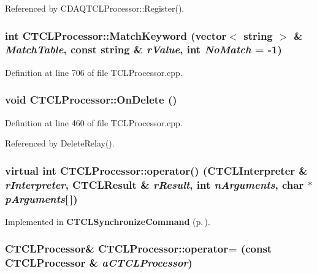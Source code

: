 Referenced by CDAQTCLProcessor::Register().
\subsubsection{\setlength{\rightskip}{0pt plus 5cm}int CTCLProcessor::Match\-Keyword (vector$<$ string $>$ \& {\em Match\-Table}, const string \& {\em r\-Value}, int {\em No\-Match} = -1)\hspace{0.3cm}{\tt  [static]}}\label{classCTCLProcessor_d3}




Definition at line 706 of file TCLProcessor.cpp.
\subsubsection{\setlength{\rightskip}{0pt plus 5cm}void CTCLProcessor::On\-Delete ()\hspace{0.3cm}{\tt  [virtual]}}\label{classCTCLProcessor_a8}




Definition at line 460 of file TCLProcessor.cpp.

Referenced by Delete\-Relay().
\subsubsection{\setlength{\rightskip}{0pt plus 5cm}virtual int CTCLProcessor::operator() ({\bf CTCLInterpreter} \& {\em r\-Interpreter}, {\bf CTCLResult} \& {\em r\-Result}, int {\em n\-Arguments}, char $\ast$ {\em p\-Arguments}[$\,$])\hspace{0.3cm}{\tt  [pure virtual]}}\label{classCTCLProcessor_a7}




Implemented in {\bf CTCLSynchronize\-Command} {\rm (p.\,\pageref{classCTCLSynchronizeCommand_a3})}.
\subsubsection{\setlength{\rightskip}{0pt plus 5cm}CTCLProcessor\& CTCLProcessor::operator= (const CTCLProcessor \& {\em a\-CTCLProcessor})\hspace{0.3cm}{\tt  [private]}}\label{classCTCLProcessor_c1}


